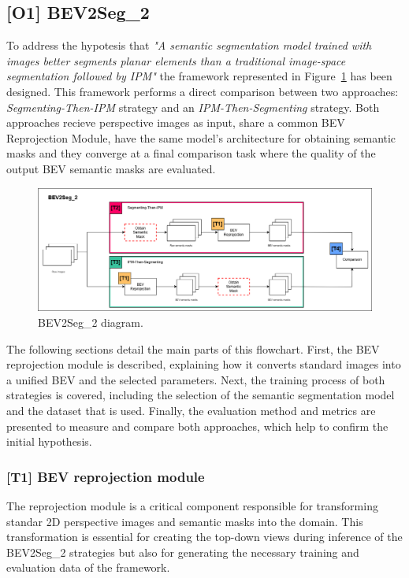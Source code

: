 \subsection{[O1] BEV2Seg\_2} \label{sec:bev2seg_2}
To address the hypotesis that \textit{"A semantic segmentation model trained with  images better segments planar elements than a traditional image-space segmentation followed by IPM"} the framework represented in Figure~\ref{fig:beg2seg_2_flow} has been designed. This framework performs a direct comparison between two approaches: \textit{Segmenting-Then-IPM} strategy and an \textit{IPM-Then-Segmenting} strategy. Both approaches recieve perspective images as input, share a common BEV Reprojection Module, have the same model's architecture for obtaining semantic masks and they converge at a final comparison task where the quality of the output BEV semantic masks are evaluated.

\begin{figure}[!ht]
    \centering
    \includegraphics[width=\linewidth]{./images/methodology/BEV2Seg_2.png}
    \caption{BEV2Seg\_2 diagram.}
    \label{fig:beg2seg_2_flow}
\end{figure}

The following sections detail the main parts of this flowchart. First, the BEV reprojection module is described, explaining how it converts standard images into a unified \acl{BEV} and the selected  parameters. Next, the training process of both strategies is covered, including the selection of the semantic segmentation model and the dataset that is used. Finally, the evaluation method and metrics are presented to measure and compare both approaches, which help to confirm the initial hypothesis.

\subsubsection{[T1] BEV reprojection module} \label{sec:bev_reprojection_module}
The  reprojection module is a critical component responsible for transforming standar 2D perspective images and semantic masks into the  domain. This transformation is essential for creating the top-down views during inference of the BEV2Seg\_2 strategies but also for generating the necessary training and evaluation data of the framework.

